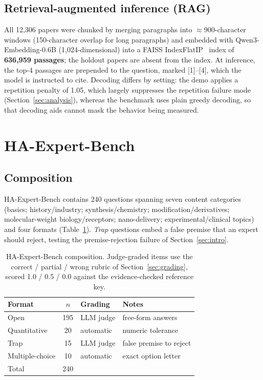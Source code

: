 \documentclass[11pt]{article}
\begin{document}
\subsection{Retrieval-augmented inference (RAG)}
\label{sec:rag}

All 12,306 papers were chunked by merging paragraphs into
$\approx$900-character windows (150-character overlap for long
paragraphs) and embedded with Qwen3-Embedding-0.6B (1,024-dimensional)
into a FAISS IndexFlatIP~\cite{faiss} index of \textbf{636,959
passages}; the holdout papers are absent from the index. At inference,
the top-4 passages are prepended to the question, marked [1]--[4],
which the model is instructed to cite. Decoding differs by setting:
the demo applies a repetition penalty of 1.05, which largely
suppresses the repetition failure mode (Section~\ref{sec:analysis}),
whereas the benchmark uses plain greedy decoding, so that decoding
aids cannot mask the behavior being measured.

\section{HA-Expert-Bench}
\label{sec:bench}

\subsection{Composition}

HA-Expert-Bench contains 240 questions spanning seven content
categories (basics; history/industry; synthesis/chemistry;
modification/derivatives; molecular-weight biology/receptors;
nano-delivery; experimental/clinical topics) and four formats
(Table~\ref{tab:benchcomp}). \emph{Trap} questions embed a false
premise that an expert should reject, testing the premise-rejection
failure of Section~\ref{sec:intro}.

\begin{table}[t]
\centering
\begin{tabular}{lcll}
\toprule
Format & $n$ & Grading & Notes \\
\midrule
Open & 195 & LLM judge & free-form answers \\
Quantitative & 20 & automatic & numeric tolerance \\
Trap & 15 & LLM judge & false premise to reject \\
Multiple-choice & 10 & automatic & exact option letter \\
\midrule
Total & 240 & & \\
\bottomrule
\end{tabular}
\caption{HA-Expert-Bench composition. Judge-graded items use the
correct / partial / wrong rubric of Section~\ref{sec:grading}, scored
1.0 / 0.5 / 0.0 against the evidence-checked reference key.}
\label{tab:benchcomp}
\end{table}
\end{document}
